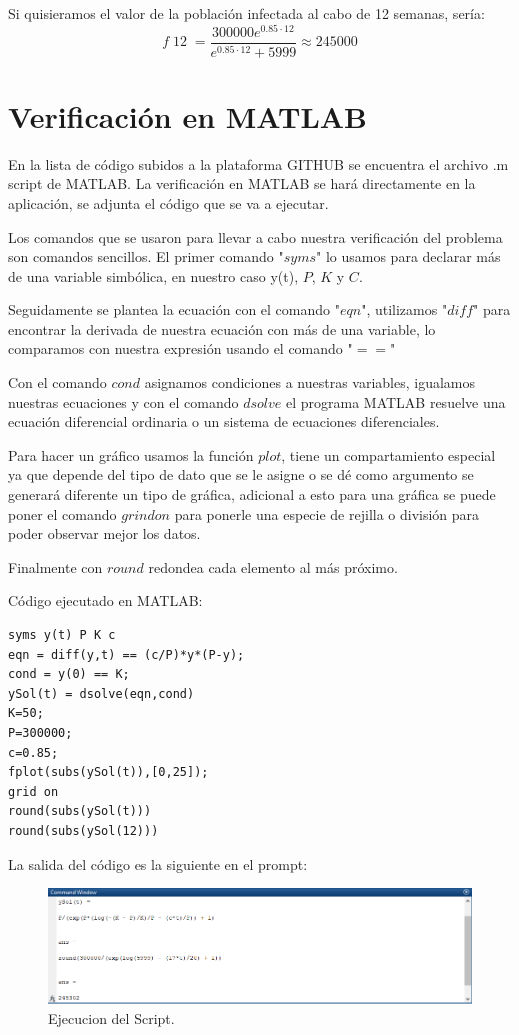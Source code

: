 \documentclass[12pt]{report}
\newcommand{\parg}[1]{\mathop{\big( #1 \big)}}
\begin{document}
Si quisieramos el valor de la población infectada al cabo de 12 semanas, sería:
$$f\parg{12}=\frac{300000 e^{0.85\cdot 12}}{e^{0.85\cdot 12}+5999}\approx 245000$$

\newpage

\section{Verificación en MATLAB}
En la lista de código subidos a la plataforma GITHUB se encuentra el archivo .m script de MATLAB.
La verificación en MATLAB se hará directamente en la aplicación, se adjunta el código que se va a ejecutar. 

Los comandos que se usaron para llevar a cabo nuestra verificación del problema son comandos sencillos. El primer comando "$syms$" lo usamos para declarar más de una variable simbólica, en nuestro caso y(t), $P$, $K$ y $C$.

Seguidamente se plantea la ecuación con el comando "$eqn$", utilizamos "$diff$" para encontrar la derivada de nuestra ecuación con más de una variable, lo comparamos con nuestra expresión usando el comando "$==$"

Con el comando $cond$ asignamos condiciones a nuestras variables, igualamos nuestras ecuaciones y con el comando $dsolve$ el programa MATLAB resuelve una ecuación diferencial ordinaria o un sistema de ecuaciones diferenciales.

Para hacer un gráfico usamos la función $plot$, tiene un compartamiento especial ya que depende del tipo de dato que se le asigne o se dé como argumento se generará diferente un tipo de gráfica, adicional a esto para una gráfica se puede poner el comando $grind on$ para ponerle una especie de rejilla o división para poder observar mejor los datos.

Finalmente con $round$ redondea cada elemento al más próximo.

Código ejecutado en MATLAB:



\begin{lstlisting}
syms y(t) P K c
eqn = diff(y,t) == (c/P)*y*(P-y);
cond = y(0) == K;
ySol(t) = dsolve(eqn,cond)
K=50;
P=300000;
c=0.85;
fplot(subs(ySol(t)),[0,25]);
grid on
round(subs(ySol(t)))
round(subs(ySol(12)))
\end{lstlisting}


\newpage

La salida del código es la siguiente en el prompt:
\begin{figure}[H]
\centering
\includegraphics[scale=0.9]{IMAGEN SALIDA.png}
\caption{Ejecucion del Script.}\label{IMAGEN SALIDA}
\end{figure}
\end{document}
